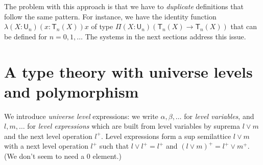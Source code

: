 \documentclass[11pt,a4paper]{article}
\def\NN{\mathsf{N}}
\def\UU{\mathsf{U}}
\newcommand{\T}{\mathsf{T}}
\begin{document}
%
%
The problem with this approach is that we have to {\em duplicate} definitions that follow
the same pattern. For instance, we have the identity function $\lambda (X:\UU_n)(x:\T_n(X))x$
of type $\Pi (X:\UU_n)(\T_n(X)\rightarrow \T_n(X))$ that can be defined for $n = 0,1,\dots$
The systems in the next sections address this issue.

\section{A type theory with universe levels and polymorphism }\label{sec:internal}

We introduce {\em universe level} expressions: we write $\alpha,\beta,\dots$
for {\em level variables}, and $l,m,\dots$ for {\em level expressions} which are built from level variables
by suprema $l \vee m$ and the next level operation $l^+$.
Level expressions form a sup semilattice $l\vee m$
with a next level operation $l^+$ such that $l \vee l^+ = l^+$
and $(l\vee m)^+ = l^+\vee m^+$. (We don't seem to need a $0$ element.)
\end{document}
